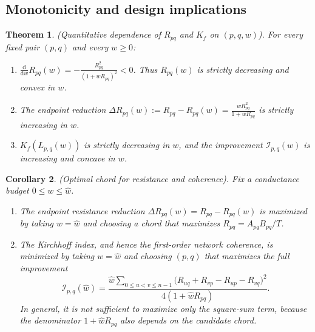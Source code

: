 \documentclass[11pt]{article}
\numberwithin{equation}{section}
\newtheorem{theorem}{Theorem}[section]
\newtheorem{corollary}[theorem]{Corollary}
\theoremstyle{definition}
\theoremstyle{remark}
\begin{document}
\subsection{Monotonicity and design implications}

\begin{theorem}\label{thm:R_Kf_quant}
	\emph{(Quantitative dependence of $R_{pq}$ and $K_f$ on $(p,q,w)$).}
	For every fixed pair $(p,q)$ and every $w\ge0$:
	\begin{enumerate}
		\item[\textnormal{(i)}] $\frac{\mathrm{d}}{\mathrm{d}w}R_{pq}(w)=-\frac{R_{pq}^2}{(1+wR_{pq})^2}<0$.
		Thus $R_{pq}(w)$ is strictly decreasing and convex in $w$.
		\item[\textnormal{(ii)}] The endpoint reduction $\Delta R_{pq}(w):=R_{pq}-R_{pq}(w)=\frac{wR_{pq}^2}{1+wR_{pq}}$ is strictly increasing in $w$.
		\item[\textnormal{(iii)}] $K_f(L_{p,q}(w))$ is strictly decreasing in $w$, and the improvement $\mathcal I_{p,q}(w)$ is increasing and concave in $w$.
	\end{enumerate}
\end{theorem}


\begin{corollary}\label{cor:selection_RK}
	\emph{(Optimal chord for resistance and coherence).}
	Fix a conductance budget $0\le w\le \hat{w}$.
	\begin{enumerate}
		\item[\textnormal{(i)}]  The endpoint resistance reduction $\Delta R_{pq}(w)=R_{pq}-R_{pq}(w)$ is maximized by taking $w=\hat w$ and choosing a chord that maximizes $R_{pq}=A_{pq}B_{pq}/T$.
		
		\item[\textnormal{(ii)}] The Kirchhoff index, and hence the first-order network coherence, is minimized by taking $w=\hat{w}$ and choosing $(p,q)$ that maximizes the full improvement
		\begin{equation*}
			\mathcal {I}_{p,q}(\hat{w})
			=
			\frac{\hat{w}\sum_{0\le u<v\le n-1}\bigl(R_{uq}+R_{vp}-R_{up}-R_{vq}\bigr)^2}{4(1+\hat{w} R_{pq})}.
		\end{equation*}
		In general, it is not sufficient to maximize only the square-sum term, because the denominator $1+\hat{w} R_{pq}$ also depends on the candidate chord.
	\end{enumerate}
\end{corollary}
\end{document}
